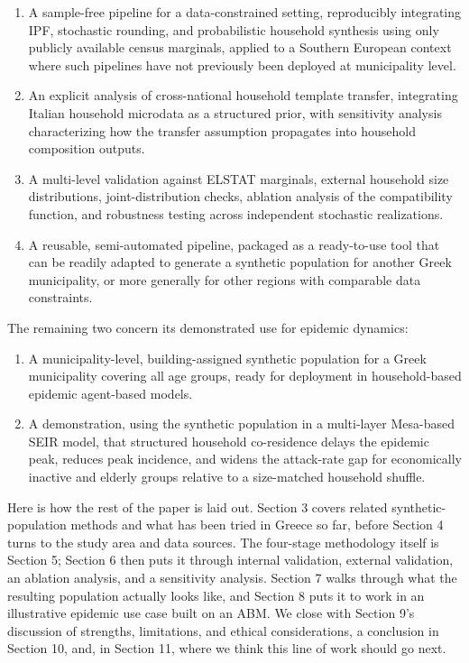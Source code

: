 \documentclass{article}
\begin{document}
\begin{enumerate}
\item A sample-free pipeline for a data-constrained setting, reproducibly integrating IPF, stochastic rounding, and probabilistic household synthesis using only publicly available census marginals, applied to a Southern European context where such pipelines have not previously been deployed at municipality level.
\item An explicit analysis of cross-national household template transfer, integrating Italian household microdata as a structured prior, with sensitivity analysis characterizing how the transfer assumption propagates into household composition outputs.
\item A multi-level validation against ELSTAT marginals, external household size distributions, joint-distribution checks, ablation analysis of the compatibility function, and robustness testing across independent stochastic realizations.
\item A reusable, semi-automated pipeline, packaged as a ready-to-use tool that can be readily adapted to generate a synthetic population for another Greek municipality, or more generally for other regions with comparable data constraints.
\end{enumerate}

The remaining two concern its demonstrated use for epidemic dynamics:

\begin{enumerate}
\item A municipality-level, building-assigned synthetic population for a Greek municipality covering all age groups, ready for deployment in household-based epidemic agent-based models.
\item A demonstration, using the synthetic population in a multi-layer Mesa-based SEIR model, that structured household co-residence delays the epidemic peak, reduces peak incidence, and widens the attack-rate gap for economically inactive and elderly groups relative to a size-matched household shuffle.
\end{enumerate}

Here is how the rest of the paper is laid out. Section 3 covers related synthetic-population methods and what has been tried in Greece so far, before Section 4 turns to the study area and data sources. The four-stage methodology itself is Section 5; Section 6 then puts it through internal validation, external validation, an ablation analysis, and a sensitivity analysis. Section 7 walks through what the resulting population actually looks like, and Section 8 puts it to work in an illustrative epidemic use case built on an ABM. We close with Section 9's discussion of strengths, limitations, and ethical considerations, a conclusion in Section 10, and, in Section 11, where we think this line of work should go next.
\end{document}
